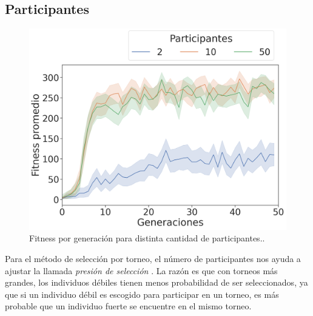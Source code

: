 \documentclass[twocolumn,spanish]{revtex4-1}
\begin{document}
\subsection{Participantes}
\begin{figure}[ht]
    \centering
    \includegraphics[width=0.9\linewidth]{eval_participantes.png}
    \caption{Fitness por generación para distinta cantidad de participantes..}
    \label{fig:eval_participantes}
\end{figure}

Para el método de selección por torneo, el número de participantes nos ayuda a ajustar la llamada \textit{presión de selección} \cite{Miller1995GeneticAT}. La razón es que con torneos más grandes, los individuos débiles tienen menos probabilidad de ser seleccionados, ya que si un individuo débil es escogido para participar en un torneo, es más probable que un individuo fuerte se encuentre en el mismo torneo. 
\end{document}
